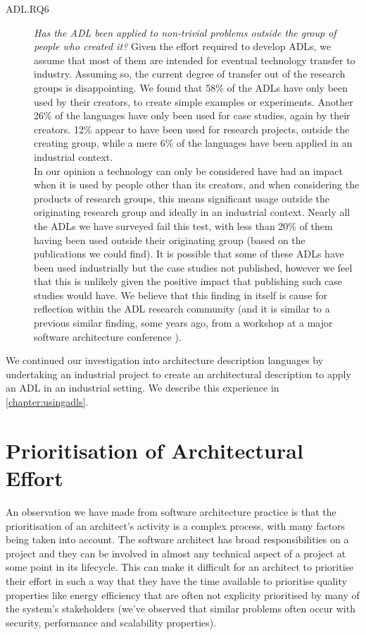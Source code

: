 \begin{description}
\item[ADL.RQ6] \emph{Has the ADL been applied to non-trivial problems outside the group of people who created it?}
Given the effort required to develop ADLs, we assume that most of them are intended for eventual technology transfer to industry.  Assuming so, the current degree of transfer out of the research groups is disappointing.  We found that 58\% of the ADLs have only been used by their creators, to create simple examples or experiments.  Another 26\% of the languages have only been used for case studies, again by their creators.  12\% appear to have been used for research projects, outside the creating group, while a mere 6\% of the languages have been applied in an industrial context. \\
In our opinion a technology can only be considered have had an impact when it is used by people other than its creators, and when considering the products of research groups, this means significant usage outside the originating research group and ideally in an industrial context.  Nearly all the ADLs we have surveyed fail this test, with less than 20\% of them having been used outside their originating group (based on the publications we could find).  It is possible that some of these ADLs have been used industrially but the case studies not published, however we feel that this is unlikely given the positive impact that publishing such case studies would have.  We believe that this finding in itself is cause for reflection within the ADL research community (and it is similar to a previous similar finding, some years ago, from a workshop at a major software architecture conference \cite{woodshilliard2005-adlsinpractice}).
\end{description}

We continued our investigation into architecture description languages by undertaking an industrial project to create an architectural description to apply an ADL in an industrial setting.  We describe this experience in \cref{chapter:usingadls}.

\section{Prioritisation of Architectural Effort}
\label{section:litreview-prioritisation}

An observation we have made from software architecture practice is that the prioritisation of an architect's activity is a complex process, with many factors being taken into account. The software architect has broad responsibilities on a project and they can be involved in almost any technical aspect of a project at some point in its lifecycle. This can make it difficult for an architect to prioritise their effort in such a way that they have the time available to prioritise quality properties like energy efficiency that are often not explicity prioritised by many of the system's stakeholders (we've observed that similar problems often occur with security, performance and scalability properties).


